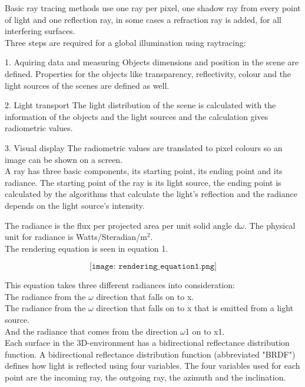 \documentclass[a4paper,12pt,oneside,final]{report}
\begin{document}
Basic ray tracing methods use one ray per pixel, one shadow ray from every point of light and one reflection ray, in some cases a refraction ray is added, for all interfering surfaces.\\

Three steps are required for a global illumination using raytracing:

1. Aquiring data and measuring
	Objects dimensions and position in the scene are defined. Properties for the objects like transparency, reflectivity, colour and the light sources of the scenes are defined as well.
    
2. Light transport 
	The light distribution of the scene is calculated with the information of the objects and the light sources and the calculation gives radiometric values.
    
3. Visual display
	The radiometric values are translated to pixel colours so an image can be shown on a screen.
\\

A ray has three basic components, its starting point, its ending point and its radiance.
The starting point of the ray is its light source, the ending point is calculated by the algorithms that calculate the light's reflection and the radiance depends on the light source's intensity. 

The radiance is the flux per projected area per unit solid angle d$\omega$. The physical unit for radiance is Watts/Steradian/m$^2$.\\ 


The rendering equation is seen in equation 1. 
\begin{center}
\begin{equation} \label{eq:solve}
\texttt{[image: rendering\_equation1.png]}
\end{equation}
\end{center}
This equation takes three different radiances into consideration:\\
The radiance from the $\omega$ direction that falls on to x.\\
The radiance from the $\omega$ direction that falls on to x that is emitted from a light source.\\
And the radiance that comes from the direction $\omega$1 on to x1.\\
Each surface in the 3D-environment has a bidirectional reflectance distribution function.
A bidirectional reflectance distribution function (abbreviated "BRDF") defines how light is reflected using four variables. The four variables used for each point are the incoming ray, the outgoing ray, the azimuth and the inclination. \\
\end{document}
